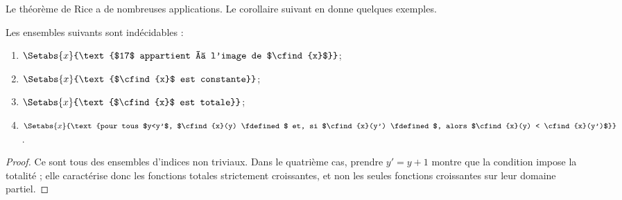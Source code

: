 \documentclass[../../../include/open-logic-section]{subfiles}
\begin{document}
Le théorème de Rice a de nombreuses applications.
Le corollaire suivant en donne quelques exemples.
\begin{cor}
Les ensembles suivants sont indécidables :
\begin{enumerate}
\item $\Setabs{x}{\text{$17$ appartient à l'image de $\cfind{x}$}}$;
\item $\Setabs{x}{\text{$\cfind{x}$ est constante}}$;
\item $\Setabs{x}{\text{$\cfind{x}$ est totale}}$;
\item $\Setabs{x}{\text{pour tous $y<y'$, $\cfind{x}(y) \fdefined$ et,
    si $\cfind{x}(y') \fdefined$, alors $\cfind{x}(y) < \cfind{x}(y')$}}$.
\end{enumerate}
\end{cor}

\begin{proof}
Ce sont tous des ensembles d'indices non triviaux. Dans le quatrième cas, prendre $y'=y+1$ montre que la condition impose la totalité ; elle caractérise donc les fonctions totales strictement croissantes, et non les seules fonctions croissantes sur leur domaine partiel.
\end{proof}
\end{document}
